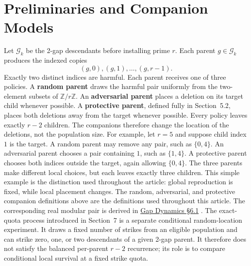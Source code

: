 \section{Preliminaries and Companion Models}
Let $\mathcal G_k$ be the 2-gap descendants before installing prime $r$. Each parent $g\in\mathcal G_k$ produces the indexed copies
\begin{equation*}
(g,0),(g,1),\ldots,(g,r-1).
\end{equation*}
Exactly two distinct indices are harmful. Each parent receives one of three policies. A \textbf{random parent} draws the harmful pair uniformly from the two-element subsets of $\mathbb Z/r\mathbb Z$. An \textbf{adversarial parent} places a deletion on its target child whenever possible. A \textbf{protective parent}, defined fully in Section~5.2, places both deletions away from the target whenever possible.
Every policy leaves exactly $r-2$ children. The companions therefore change the location of the deletions, not the population size.
For example, let $r=5$ and suppose child index $1$ is the target. A random parent may remove any pair, such as $\{0,4\}$. An adversarial parent chooses a pair containing $1$, such as $\{1,4\}$. A protective parent chooses both indices outside the target, again allowing $\{0,4\}$. The three parents make different local choices, but each leaves exactly three children. This simple example is the distinction used throughout the article: global reproduction is fixed, while local placement changes.
The random, adversarial, and protective companion definitions above are the definitions used throughout this article. The corresponding real modular pair is derived in \href{https://github.com/thiagomata/prime-numbers/blob/master/articles/chapter6/gap-dynamics.md#61-one-new-prime-forbids-two-copy-classes}{Gap Dynamics \S{}6.1} \cite{gapdynamics2026}.
The exact-quota process introduced in Section~7 is a separate conditional random-location experiment. It draws a fixed number of strikes from an eligible population and can strike zero, one, or two descendants of a given 2-gap parent. It therefore does not satisfy the balanced per-parent $r-2$ recurrence; its role is to compare conditional local survival at a fixed strike quota.

